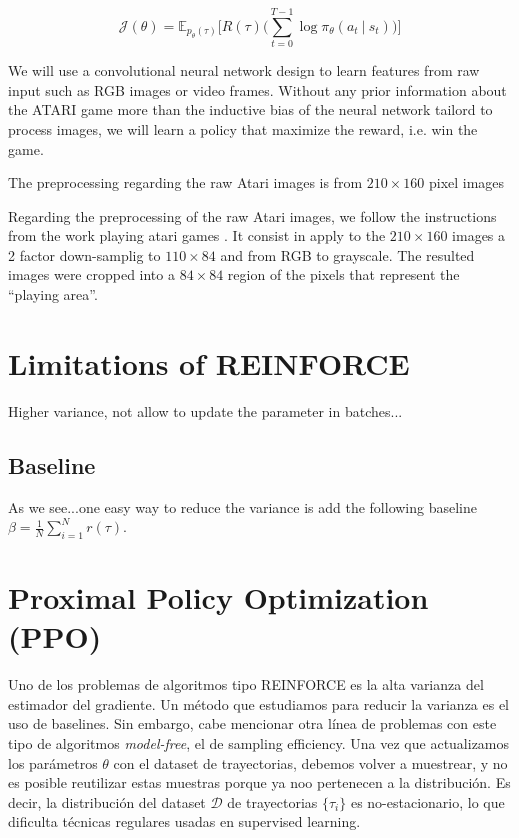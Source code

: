 \begin{equation}\label{eqn:reinforce-gradient-estimator-cost}
    \mathcal{J}(\theta) = \mathbb{E}_{p_{\theta}(\tau)}\bigg[R(\tau)\bigg(\sum_{t=0}^{T-1} \log \pi_{\theta} (a_t~|~s_t) \bigg)\bigg] 
\end{equation}

We will use a convolutional neural network design to learn features from
raw input such as RGB images or video frames. Without any prior information about the ATARI game more than the inductive bias of the neural network tailord to process images, we will learn a policy that maximize the reward, i.e. win
the game.

The preprocessing regarding the raw Atari images is from $210\times 160$ pixel 
images

Regarding the preprocessing of the raw Atari images, we follow the instructions
from the work playing atari games \cite{mnih2013playing}. It consist in
apply to the $210\times 160$ images a 2 factor down-samplig to $110\times 84$
and from RGB to grayscale. The resulted images were cropped into a $84\times84$
region of the pixels that represent the ``playing area''.

\section{Limitations of REINFORCE}

Higher variance, not allow to update the parameter in batches...

\subsection{Baseline}

As we see...one easy way to reduce the variance is add the following
baseline $\beta=\frac{1}{N}\sum_{i=1}^{N} r(\tau)$.

\section{Proximal Policy Optimization (PPO)}

Uno de los problemas de algoritmos tipo REINFORCE es la alta varianza del
estimador del gradiente. Un método que estudiamos para reducir la varianza
es el uso de baselines. Sin embargo, cabe mencionar otra línea de problemas
con este tipo de algoritmos \textit{model-free}, el de sampling efficiency. Una
vez que actualizamos los parámetros $\theta$ con el dataset de trayectorias,
debemos volver a muestrear, y no es posible reutilizar estas muestras porque
ya noo pertenecen a la distribución. Es decir, la distribución del dataset
$\mathcal{D}$ de trayectorias $\{\tau_i\}$ es no-estacionario, lo que dificulta
técnicas regulares usadas en supervised learning.

